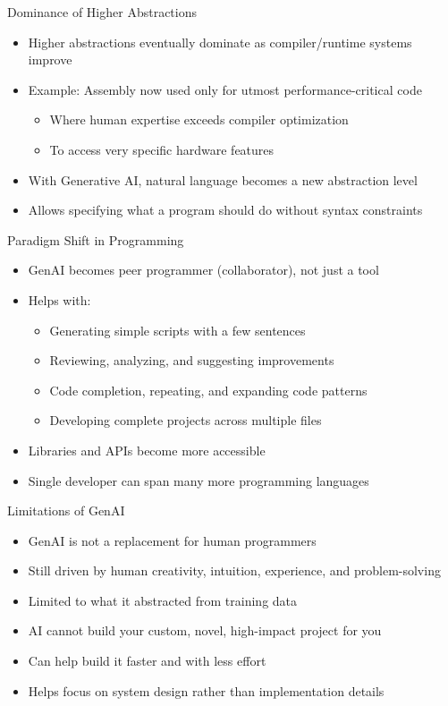 \documentclass[xcolor={dvipsnames}, aspectratio=169]{beamer}
\begin{document}
\begin{frame}{Dominance of Higher Abstractions}
  \begin{itemize}
    \item Higher abstractions eventually dominate as compiler/runtime systems improve
    \item Example: Assembly now used only for utmost performance-critical code
      \begin{itemize}
        \item Where human expertise exceeds compiler optimization
        \item To access very specific hardware features
      \end{itemize}
    \item With Generative AI, natural language becomes a new abstraction level
    \item Allows specifying what a program should do without syntax constraints
  \end{itemize}
\end{frame}

\begin{frame}{Paradigm Shift in Programming}
  \begin{itemize}
    \item GenAI becomes peer programmer (collaborator), not just a tool
    \item Helps with:
      \begin{itemize}
        \item Generating simple scripts with a few sentences
        \item Reviewing, analyzing, and suggesting improvements
        \item Code completion, repeating, and expanding code patterns
        \item Developing complete projects across multiple files
      \end{itemize}
    \item Libraries and APIs become more accessible
    \item Single developer can span many more programming languages
  \end{itemize}
\end{frame}

\begin{frame}{Limitations of GenAI}
  \begin{itemize}
    \item GenAI is not a replacement for human programmers
    \item Still driven by human creativity, intuition, experience, and problem-solving
    \item Limited to what it abstracted from training data
    \item AI cannot build your custom, novel, high-impact project for you
    \item Can help build it faster and with less effort
    \item Helps focus on system design rather than implementation details
  \end{itemize}
\end{frame}
\end{document}
